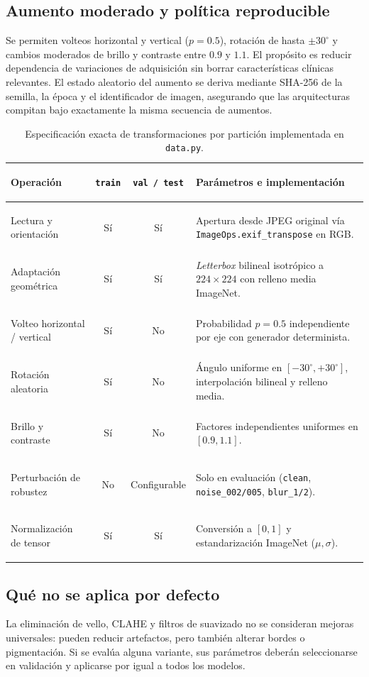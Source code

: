 \subsection{Aumento moderado y política reproducible}
Se permiten volteos horizontal y vertical ($p=0.5$), rotación de hasta $\pm 30^\circ$ y cambios moderados de brillo y contraste entre $0.9$ y $1.1$. El propósito es reducir dependencia de variaciones de adquisición sin borrar características clínicas relevantes. El estado aleatorio del aumento se deriva mediante SHA-256 de la semilla, la época y el identificador de imagen, asegurando que las arquitecturas compitan bajo exactamente la misma secuencia de aumentos.

\begin{table}[htbp]\centering\small
\caption{Especificación exacta de transformaciones por partición implementada en \texttt{data.py}.}
\begin{tabularx}{\textwidth}{@{}>{\bfseries\raggedright\arraybackslash}p{4.1cm}cc>{\raggedright\arraybackslash}X@{}}
\toprule
\textbf{Operación} & \textbf{\texttt{train}} & \textbf{\texttt{val / test}} & \textbf{Parámetros e implementación} \\ \midrule
Lectura y orientación & Sí & Sí & Apertura desde JPEG original vía \texttt{ImageOps.exif\_transpose} en RGB. \\
Adaptación geométrica & Sí & Sí & \textit{Letterbox} bilineal isotrópico a $224\times224$ con relleno media ImageNet. \\
Volteo horizontal / vertical & Sí & No & Probabilidad $p=0.5$ independiente por eje con generador determinista. \\
Rotación aleatoria & Sí & No & Ángulo uniforme en $[-30^\circ, +30^\circ]$, interpolación bilineal y relleno media. \\
Brillo y contraste & Sí & No & Factores independientes uniformes en $[0.9, 1.1]$. \\
Perturbación de robustez & No & Configurable & Solo en evaluación (\texttt{clean}, \texttt{noise\_002/005}, \texttt{blur\_1/2}). \\
Normalización de tensor & Sí & Sí & Conversión a $[0,1]$ y estandarización ImageNet ($\mu,\sigma$). \\
\bottomrule
\end{tabularx}
\end{table}

\subsection{Qué no se aplica por defecto}
La eliminación de vello, CLAHE y filtros de suavizado no se consideran mejoras universales: pueden reducir artefactos, pero también alterar bordes o pigmentación. Si se evalúa alguna variante, sus parámetros deberán seleccionarse en validación y aplicarse por igual a todos los modelos.
\FloatBarrier
